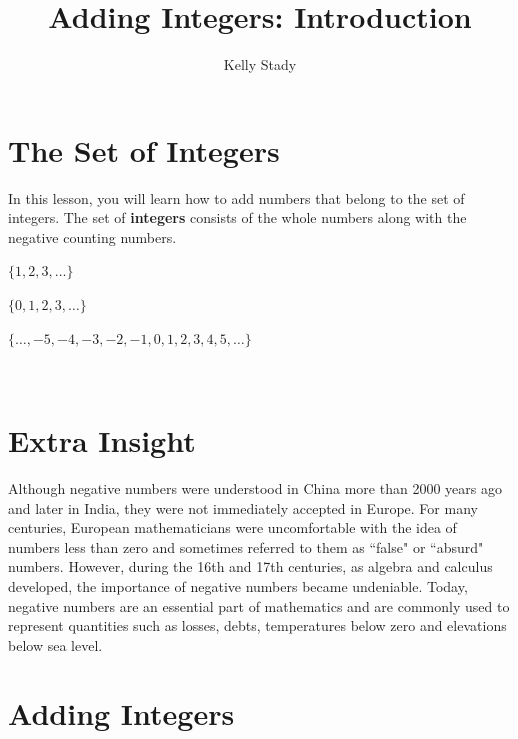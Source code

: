 \documentclass{ximera}[font=12pt]
\title{Adding Integers: Introduction}   %
\author{Kelly Stady}
\begin{document}
  


\begin{abstract}

\end{abstract}


\maketitle
\label{xim:AddIntroActivity}


\section*{The Set of Integers}

In this lesson, you will learn how to add numbers that belong to the set of integers.  The set of \textbf{integers} consists of the whole numbers along with the negative counting numbers.

\begin{description}[itemsep=1ex]  %
    \item[\textbf{Counting Numbers}] $\{ 1, 2, 3, \ldots \}$
    \item[\textbf{Whole Numbers}] $\{0, 1, 2, 3, \ldots \}$
    \item[\textbf{Integers}] $\{ \ldots, -5, -4, -3, -2, -1, 0, 1, 2, 3, 4, 5, \ldots \}$
\end{description}

~ \\[2em]


\insightIcon

\section*{Extra Insight}

\normalsize
Although negative numbers were understood in China more than 2000 years ago and later in India, they were not immediately accepted in Europe.
For many centuries, European mathematicians were uncomfortable with the idea of numbers less than zero and sometimes referred to them  as ``false" or
``absurd" numbers.  However, during the 16th and 17th centuries, as algebra and calculus developed, the importance of negative numbers became undeniable.
Today, negative numbers are an essential part of mathematics and are commonly used to represent quantities such as losses, debts, temperatures below zero and
elevations below sea level.

\section*{Adding Integers}
\end{document}
